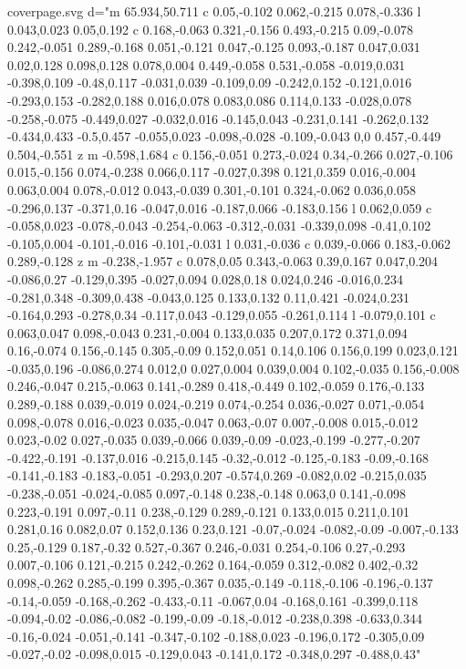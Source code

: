 \begin{filecontents}[noheader]{coverpage.svg}
					 d="m 65.934,50.711 c 0.05,-0.102 0.062,-0.215 0.078,-0.336 l 0.043,0.023 0.05,0.192 c 0.168,-0.063 0.321,-0.156 0.493,-0.215 0.09,-0.078 0.242,-0.051 0.289,-0.168 0.051,-0.121 0.047,-0.125 0.093,-0.187 0.047,0.031 0.02,0.128 0.098,0.128 0.078,0.004 0.449,-0.058 0.531,-0.058 -0.019,0.031 -0.398,0.109 -0.48,0.117 -0.031,0.039 -0.109,0.09 -0.242,0.152 -0.121,0.016 -0.293,0.153 -0.282,0.188 0.016,0.078 0.083,0.086 0.114,0.133 -0.028,0.078 -0.258,-0.075 -0.449,0.027 -0.032,0.016 -0.145,0.043 -0.231,0.141 -0.262,0.132 -0.434,0.433 -0.5,0.457 -0.055,0.023 -0.098,-0.028 -0.109,-0.043 0,0 0.457,-0.449 0.504,-0.551 z m -0.598,1.684 c 0.156,-0.051 0.273,-0.024 0.34,-0.266 0.027,-0.106 0.015,-0.156 0.074,-0.238 0.066,0.117 -0.027,0.398 0.121,0.359 0.016,-0.004 0.063,0.004 0.078,-0.012 0.043,-0.039 0.301,-0.101 0.324,-0.062 0.036,0.058 -0.296,0.137 -0.371,0.16 -0.047,0.016 -0.187,0.066 -0.183,0.156 l 0.062,0.059 c -0.058,0.023 -0.078,-0.043 -0.254,-0.063 -0.312,-0.031 -0.339,0.098 -0.41,0.102 -0.105,0.004 -0.101,-0.016 -0.101,-0.031 l 0.031,-0.036 c 0.039,-0.066 0.183,-0.062 0.289,-0.128 z m -0.238,-1.957 c 0.078,0.05 0.343,-0.063 0.39,0.167 0.047,0.204 -0.086,0.27 -0.129,0.395 -0.027,0.094 0.028,0.18 0.024,0.246 -0.016,0.234 -0.281,0.348 -0.309,0.438 -0.043,0.125 0.133,0.132 0.11,0.421 -0.024,0.231 -0.164,0.293 -0.278,0.34 -0.117,0.043 -0.129,0.055 -0.261,0.114 l -0.079,0.101 c 0.063,0.047 0.098,-0.043 0.231,-0.004 0.133,0.035 0.207,0.172 0.371,0.094 0.16,-0.074 0.156,-0.145 0.305,-0.09 0.152,0.051 0.14,0.106 0.156,0.199 0.023,0.121 -0.035,0.196 -0.086,0.274 0.012,0 0.027,0.004 0.039,0.004 0.102,-0.035 0.156,-0.008 0.246,-0.047 0.215,-0.063 0.141,-0.289 0.418,-0.449 0.102,-0.059 0.176,-0.133 0.289,-0.188 0.039,-0.019 0.024,-0.219 0.074,-0.254 0.036,-0.027 0.071,-0.054 0.098,-0.078 0.016,-0.023 0.035,-0.047 0.063,-0.07 0.007,-0.008 0.015,-0.012 0.023,-0.02 0.027,-0.035 0.039,-0.066 0.039,-0.09 -0.023,-0.199 -0.277,-0.207 -0.422,-0.191 -0.137,0.016 -0.215,0.145 -0.32,-0.012 -0.125,-0.183 -0.09,-0.168 -0.141,-0.183 -0.183,-0.051 -0.293,0.207 -0.574,0.269 -0.082,0.02 -0.215,0.035 -0.238,-0.051 -0.024,-0.085 0.097,-0.148 0.238,-0.148 0.063,0 0.141,-0.098 0.223,-0.191 0.097,-0.11 0.238,-0.129 0.289,-0.121 0.133,0.015 0.211,0.101 0.281,0.16 0.082,0.07 0.152,0.136 0.23,0.121 -0.07,-0.024 -0.082,-0.09 -0.007,-0.133 0.25,-0.129 0.187,-0.32 0.527,-0.367 0.246,-0.031 0.254,-0.106 0.27,-0.293 0.007,-0.106 0.121,-0.215 0.242,-0.262 0.164,-0.059 0.312,-0.082 0.402,-0.32 0.098,-0.262 0.285,-0.199 0.395,-0.367 0.035,-0.149 -0.118,-0.106 -0.196,-0.137 -0.14,-0.059 -0.168,-0.262 -0.433,-0.11 -0.067,0.04 -0.168,0.161 -0.399,0.118 -0.094,-0.02 -0.086,-0.082 -0.199,-0.09 -0.18,-0.012 -0.238,0.398 -0.633,0.344 -0.16,-0.024 -0.051,-0.141 -0.347,-0.102 -0.188,0.023 -0.196,0.172 -0.305,0.09 -0.027,-0.02 -0.098,0.015 -0.129,0.043 -0.141,0.172 -0.348,0.297 -0.488,0.43"

\end{filecontents}
